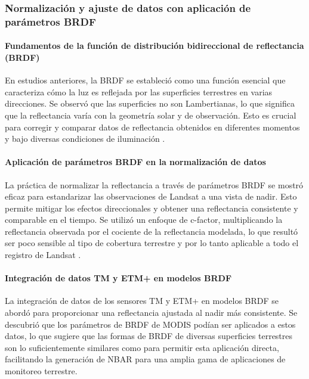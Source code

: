             \subsubsection{Normalización y ajuste de datos con aplicación de parámetros BRDF}    

                \paragraph{Fundamentos de la función de distribución bidireccional de reflectancia (BRDF)}
                    En estudios anteriores, la BRDF se estableció como una función esencial que caracteriza cómo la luz es reflejada por las superficies terrestres en varias direcciones. Se observó que las superficies no son Lambertianas, lo que significa que la reflectancia varía con la geometría solar y de observación. Esto es crucial para corregir y comparar datos de reflectancia obtenidos en diferentes momentos y bajo diversas condiciones de iluminación \autocite{roy2016general}.
                \paragraph{Aplicación de parámetros BRDF en la normalización de datos}
                    La práctica de normalizar la reflectancia a través de parámetros BRDF se mostró eficaz para estandarizar las observaciones de Landsat a una vista de nadir. Esto permite mitigar los efectos direccionales y obtener una reflectancia consistente y comparable en el tiempo. Se utilizó un enfoque de c-factor, multiplicando la reflectancia observada por el cociente de la reflectancia modelada, lo que resultó ser poco sensible al tipo de cobertura terrestre y por lo tanto aplicable a todo el registro de Landsat \autocite{roy2016general}.
                \paragraph{Integración de datos TM y ETM+ en modelos BRDF}
                    La integración de datos de los sensores TM y ETM+ en modelos BRDF se abordó para proporcionar una reflectancia ajustada al nadir más consistente. Se descubrió que los parámetros de BRDF de MODIS podían ser aplicados a estos datos, lo que sugiere que las formas de BRDF de diversas superficies terrestres son lo suficientemente similares como para permitir esta aplicación directa, facilitando la generación de NBAR para una amplia gama de aplicaciones de monitoreo terrestre.

